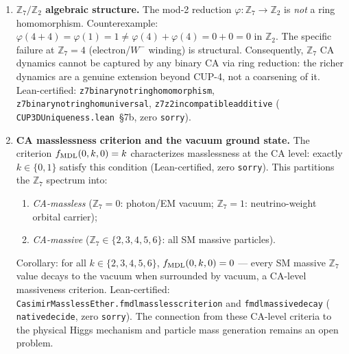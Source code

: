 \documentclass[11pt]{article}
\theoremstyle{remark}
\newcommand{\lean}[1]{%
  \penalty-100
  \begingroup\def\_{\textunderscore\allowbreak}\texttt{#1}\endgroup}
\begin{document}
\begin{enumerate}
This CA-internal uniqueness of $p=5$ converges with P01's algebraic derivation from the SM spectrum;
the two derivations are independent and both select $N_{\rm fam}=5$. The deeper question ---
why this specific coincidence holds --- remains an open direction for future derivations.
The $\mathbb{Z}_5$ \emph{rotational equivariance} of $f_{\rm MDL}$ on the 5-cell ring ---
distinct from $\mathbb{Z}_7$ additive gauge symmetry --- is fully resolved (machine-certified in Lean~4):
\lean{CUP3D.fmdl\_z5\_equivariant} (ugp-lean, zero \texttt{sorry})
certifies exact $\mathbb{Z}_5$-equivariance over all $7^5 = 16{,}807$ states and all 5
rotations; see Remark~\ref{rem:z5_equivariance}.

\item \textbf{$\mathbb{Z}_7/\mathbb{Z}_2$ algebraic structure.}
The mod-2 reduction $\varphi: \mathbb{Z}_7 \to \mathbb{Z}_2$ is \emph{not} a ring homomorphism.
Counterexample: $\varphi(4+4) = \varphi(1) = 1 \neq \varphi(4)+\varphi(4) = 0 + 0 = 0$ in $\mathbb{Z}_2$.
The specific failure at $\mathbb{Z}_7 = 4$ (electron/$W^-$ winding) is structural.
Consequently, $\mathbb{Z}_7$ CA dynamics cannot be captured by any binary CA via ring reduction:
the richer dynamics are a genuine extension beyond CUP-4, not a coarsening of it.
Lean-certified: \lean{z7\_binary\_not\_ring\_homomorphism},
\lean{z7\_binary\_not\_ring\_hom\_universal}, \lean{z7\_z2\_incompatible\_additive}
(\lean{CUP3DUniqueness.lean}~\S7b, zero \texttt{sorry}).

\item \textbf{CA masslessness criterion and the vacuum ground state.}
The criterion $f_{\rm MDL}(0,k,0) = k$ characterizes masslessness at the CA level:
exactly $k \in \{0,1\}$ satisfy this condition (Lean-certified, zero \texttt{sorry}).
This partitions the $\mathbb{Z}_7$ spectrum into:
\begin{enumerate}[label=(\roman*)]
\item \emph{CA-massless} ($\mathbb{Z}_7 = 0$: photon/EM vacuum; $\mathbb{Z}_7 = 1$: neutrino-weight orbital carrier);
\item \emph{CA-massive} ($\mathbb{Z}_7 \in \{2,3,4,5,6\}$: all SM massive particles).
\end{enumerate}
Corollary: for all $k \in \{2,3,4,5,6\}$, $f_{\rm MDL}(0,k,0) = 0$ --- every SM
massive $\mathbb{Z}_7$ value decays to the vacuum when surrounded by vacuum, a CA-level massiveness criterion.
Lean-certified: \lean{CasimirMasslessEther.fmdl\_massless\_criterion} and
\lean{fmdl\_massive\_decay} (\lean{native\_decide}, zero \texttt{sorry}).
The connection from these CA-level criteria to the physical Higgs mechanism and particle mass
generation remains an open problem.


\end{enumerate}
\end{document}
